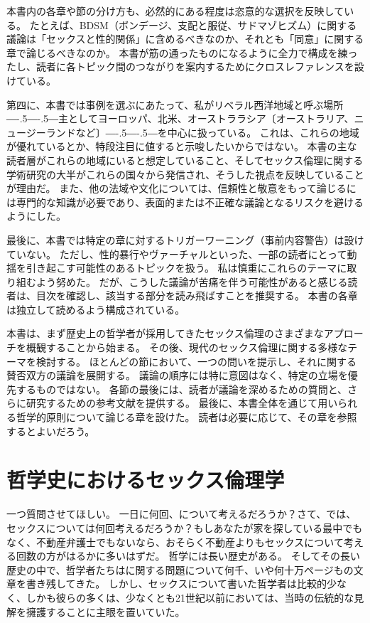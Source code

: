 \documentclass[paper=a4,book,openany]{jlreq}
\def\DDASH{―\kern-.5\zw―\kern-.5\zw―} %
\begin{document}
本書内の各章や節の分け方も、必然的にある程度は恣意的な選択を反映している。
たとえば、BDSM（ボンデージ、支配と服従、サドマゾヒズム）に関する議論は「セックスと性的関係」に含めるべきなのか、それとも「同意」に関する章で論じるべきなのか。
本書が筋の通ったものになるように全力で構成を練ったし、読者に各トピック間のつながりを案内するためにクロスレファレンスを設けている。

第四に、本書では事例を選ぶにあたって、私がリベラル西洋地域と呼ぶ場所{\DDASH}主としてヨーロッパ、北米、オーストララシア〔オーストラリア、ニュージーランドなど〕{\DDASH}を中心に扱っている。
これは、これらの地域が優れているとか、特段注目に値すると示唆したいからではない。
本書の主な読者層がこれらの地域にいると想定していること、そしてセックス倫理に関する学術研究の大半がこれらの国々から発信され、そうした視点を反映していることが理由だ。
また、他の法域や文化については、信頼性と敬意をもって論じるには専門的な知識が必要であり、表面的または不正確な議論となるリスクを避けるようにした。

最後に、本書では特定の章に対するトリガーワーニング（事前内容警告）は設けていない。
ただし、性的暴行やヴァーチャルといった、一部の読者にとって動揺を引き起こす可能性のあるトピックを扱う。
私は慎重にこれらのテーマに取り組むよう努めた。
だが、こうした議論が苦痛を伴う可能性があると感じる読者は、目次を確認し、該当する部分を読み飛ばすことを推奨する。
本書の各章は独立して読めるよう構成されている。

本書は、まず歴史上の哲学者が採用してきたセックス倫理のさまざまなアプローチを概観することから始まる。
その後、現代のセックス倫理に関する多様なテーマを検討する。
ほとんどの節において、一つの問いを提示し、それに関する賛否双方の議論を展開する。
議論の順序には特に意図はなく、特定の立場を優先するものではない。
各節の最後には、読者が議論を深めるための質問と、さらに研究するための参考文献を提供する。
最後に、本書全体を通じて用いられる哲学的原則について論じる章を設けた。
読者は必要に応じて、その章を参照するとよいだろう。

\chapter{哲学史におけるセックス倫理学}

一つ質問させてほしい。
一日に何回、について考えるだろうか？さて、では、セックスについては何回考えるだろうか？もしあなたが家を探している最中でもなく、不動産弁護士でもないなら、おそらく不動産よりもセックスについて考える回数の方がはるかに多いはずだ。
哲学には長い歴史がある。
そしてその長い歴史の中で、哲学者たちはに関する問題について何千、いや何十万ページもの文章を書き残してきた。
しかし、セックスについて書いた哲学者は比較的少なく、しかも彼らの多くは、少なくとも21世紀以前においては、当時の伝統的な見解を擁護することに主眼を置いていた。
\end{document}
